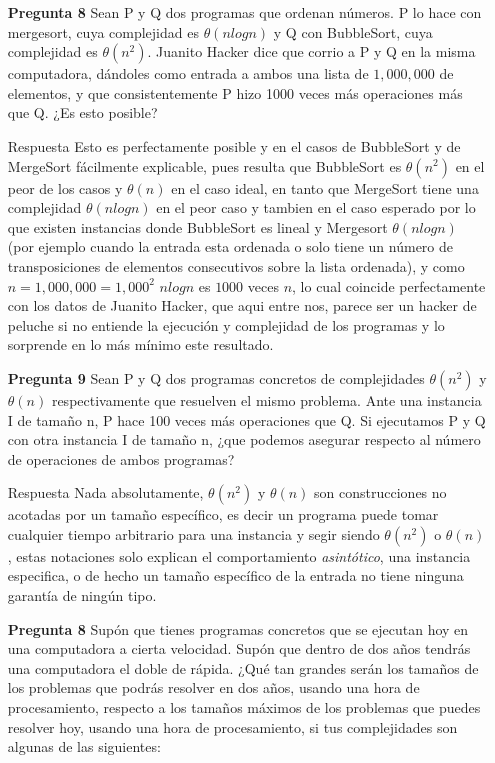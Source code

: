 \documentclass[12pt]{articlels
}
\begin{document}
\begin{itemize}
\item[\bf{Pregunta 8}] Sean P y Q dos programas que ordenan números. P lo hace con mergesort, cuya complejidad es $\theta(n log n)$ y Q con BubbleSort, cuya complejidad es $\theta(n^2)$. Juanito Hacker dice que corrio a P y Q en la misma computadora, dándoles como entrada a ambos una lista de $1,000,000$ de elementos, y que consistentemente  P hizo 1000 veces más operaciones más que Q. ¿Es esto posible?

\item[Respuesta] Esto es perfectamente posible y en el casos de BubbleSort y de MergeSort fácilmente explicable, pues resulta que BubbleSort es $\theta(n^2)$ en el peor de los casos y $\theta(n)$ en el caso ideal, en tanto que MergeSort tiene una complejidad $\theta(n log n)$ en el peor caso y tambien en el caso esperado por lo que existen instancias donde BubbleSort es lineal y Mergesort $\theta(n log n)$ (por ejemplo cuando la entrada esta ordenada o solo tiene un número de transposiciones de elementos consecutivos sobre la lista ordenada), y como $n = 1,000,000 = 1,000^2$ $nlogn$ es $1000$ veces $n$, lo cual coincide perfectamente con los datos de Juanito Hacker, que aqui entre nos, parece ser un hacker de peluche si no entiende la ejecución y complejidad de los programas y lo sorprende en lo más mínimo este resultado.

\item[\bf{Pregunta 9}]Sean P y Q dos programas concretos de complejidades $\theta(n^2)$ y $\theta(n)$ respectivamente que resuelven el mismo problema. Ante una instancia I de tamaño n, P hace 100 veces más operaciones que Q. Si ejecutamos P y Q con otra instancia I de tamaño n, ¿que podemos asegurar respecto al número de operaciones de ambos programas?

\item[Respuesta] Nada absolutamente, $\theta(n^2)$ y $\theta(n)$ son construcciones no acotadas por un tamaño específico, es decir un programa puede tomar cualquier tiempo arbitrario para una instancia y segir siendo $\theta(n^2)$ o $\theta(n)$, estas notaciones solo explican el comportamiento \emph{asintótico}, una instancia especifica, o de hecho un tamaño específico de la entrada no tiene ninguna garantía de ningún tipo.

\item[\bf{Pregunta 8}]Supón que tienes programas concretos que se ejecutan hoy en una computadora a cierta velocidad. Supón que dentro de dos años tendrás una computadora el doble de rápida. ¿Qué tan grandes serán los tamaños de los problemas que podrás resolver en dos años, usando una hora de procesamiento, respecto a los tamaños máximos de los problemas que puedes resolver hoy, usando una hora de procesamiento, si tus complejidades son algunas de las siguientes:\\


\end{itemize}
\end{document}
